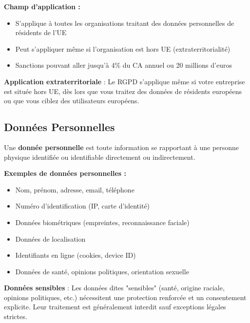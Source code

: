 \documentclass[11pt,a4paper]{article}
\begin{document}
\textbf{Champ d'application :}
\begin{itemize}
    \item S'applique à toutes les organisations traitant des données personnelles de résidents de l'UE
    \item Peut s'appliquer même si l'organisation est hors UE (extraterritorialité)
    \item Sanctions pouvant aller jusqu'à 4\% du CA annuel ou 20 millions d'euros
\end{itemize}

\begin{legalbox}
\textbf{Application extraterritoriale} : Le RGPD s'applique même si votre entreprise est située hors UE, dès lors que vous traitez des données de résidents européens ou que vous ciblez des utilisateurs européens.
\end{legalbox}

\subsection{Données Personnelles}

\begin{definitionbox}
Une \textbf{donnée personnelle} est toute information se rapportant à une personne physique identifiée ou identifiable directement ou indirectement.
\end{definitionbox}

\textbf{Exemples de données personnelles :}
\begin{itemize}
    \item Nom, prénom, adresse, email, téléphone
    \item Numéro d'identification (IP, carte d'identité)
    \item Données biométriques (empreintes, reconnaissance faciale)
    \item Données de localisation
    \item Identifiants en ligne (cookies, device ID)
    \item Données de santé, opinions politiques, orientation sexuelle
\end{itemize}

\begin{dangerbox}
\textbf{Données sensibles} : Les données dites "sensibles" (santé, origine raciale, opinions politiques, etc.) nécessitent une protection renforcée et un consentement explicite. Leur traitement est généralement interdit sauf exceptions légales strictes.
\end{dangerbox}
\end{document}
